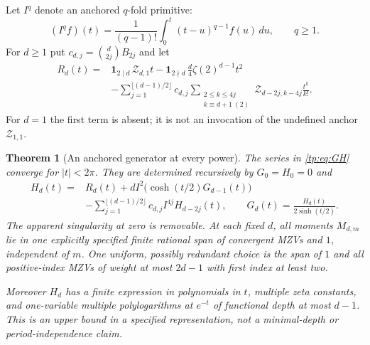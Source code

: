 \documentclass[11pt,a4paper]{article}
\numberwithin{equation}{section}
\newtheorem{theorem}{Theorem}[section]
\theoremstyle{definition}
\theoremstyle{remark}
\begin{document}
Let $I^q$ denote an anchored $q$-fold primitive:
\begin{equation}\label{tp:eq:primitive}
 (I^qf)(t)=\frac1{(q-1)!}\int_0^t(t-u)^{q-1}f(u)\,du,
 \qquad q\geq1.
\end{equation}
For $d\geq1$ put $c_{d,j}=\binom d{2j}B_{2j}$ and let
\begin{equation}\label{tp:eq:anchorpoly}
 \begin{split}
 R_d(t)={}&\mathbf1_{2\mid d}\,\mathcal Z_{d,1}t
       -\mathbf1_{2\nmid d}\,\frac d4\zeta(2)^{d-1}t^2\\
 &-\sum_{j=1}^{\lfloor(d-1)/2\rfloor}c_{d,j}
       \sum_{\substack{2\leq k\leq4j\\k\equiv d+1\ (2)}}
         \mathcal Z_{d-2j,k-4j}\frac{t^k}{k!}.
 \end{split}
\end{equation}
For $d=1$ the first term is absent; it is not an invocation of the
undefined anchor $\mathcal Z_{1,1}$.

\begin{theorem}[An anchored generator at every power]
\label{tp:thm:generator}
The series in \eqref{tp:eq:GH} converge for $|t|<2\pi$.  They are
determined recursively by $G_0=H_0=0$ and
\begin{equation}\label{tp:eq:generator}
 \boxed{\begin{aligned}
 H_d(t)={}&R_d(t)+dI^2\bigl(\cosh(t/2)G_{d-1}(t)\bigr)\\
 &-\sum_{j=1}^{\lfloor(d-1)/2\rfloor}c_{d,j}I^{4j}H_{d-2j}(t),
 \qquad G_d(t)=\frac{H_d(t)}{2\sinh(t/2)}.
 \end{aligned}}
\end{equation}
The apparent singularity at zero is removable.  At each fixed $d$,
all moments $M_{d,m}$ lie in one explicitly specified finite rational
span of convergent MZVs and $1$, independent of $m$.
One uniform, possibly redundant choice is the span of $1$ and all
positive-index MZVs of weight at most $2d-1$ with first index at least two.

Moreover $H_d$ has a finite expression in polynomials in $t$, multiple
zeta constants, and one-variable multiple polylogarithms at $e^{-t}$
of functional depth at most $d-1$.  This is an upper bound in a
specified representation, not a minimal-depth or period-independence claim.
\end{theorem}
\end{document}
